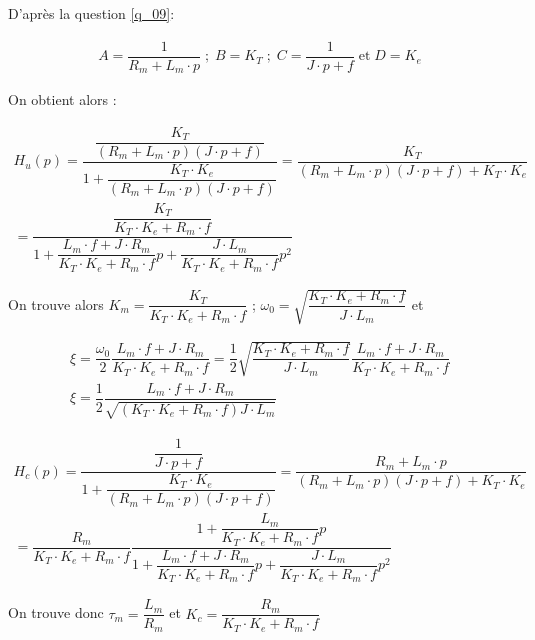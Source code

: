 \ifprof
\begin{corrige}
D'après la question \ref{q_09}: 

\begin{align*}
A=\dfrac{1}{R_m+L_m\cdot p} \;;\; B=K_T\;;\;C=\dfrac{1}{J\cdot p+f}\;\text{et} \;D=K_e
\end{align*}

On obtient alors : 

\begin{align*}
H_u(p)=\dfrac{\dfrac{K_T}{\left(R_m+L_m\cdot p\right)\left(J\cdot p+f\right)}}{1+\dfrac{K_T\cdot K_e}{\left(R_m+L_m\cdot p\right)\left(J\cdot p+f\right)}}
=\dfrac{K_T}{\left(R_m+L_m\cdot p\right)\left(J\cdot p+f\right)+K_T\cdot K_e}\\
=\dfrac{\dfrac{K_T}{K_T\cdot K_e+R_m\cdot f}}{1+\dfrac{L_m\cdot f+J\cdot R_m}{K_T\cdot K_e+R_m\cdot f}p+\dfrac{J\cdot L_m}{K_T\cdot K_e+R_m\cdot f}p^2}
\end{align*}

On trouve alors $K_m=\dfrac{K_T}{K_T\cdot K_e+R_m\cdot f}$ ; $\omega_0=\sqrt{\dfrac{K_T\cdot K_e+R_m\cdot f}{J\cdot L_m}}$ et

\begin{align*}
\xi=\dfrac{\omega_0}{2}\dfrac{L_m\cdot f+J\cdot R_m}{K_T\cdot K_e+R_m\cdot f}=\dfrac{1}{2}\sqrt{\dfrac{K_T\cdot K_e+R_m\cdot f}{J\cdot L_m}}\dfrac{L_m\cdot f+J\cdot R_m}{K_T\cdot K_e+R_m\cdot f}\\
\xi=\dfrac{1}{2}\dfrac{L_m\cdot f+J\cdot R_m}{\sqrt{\left(K_T\cdot K_e+R_m\cdot f\right)J\cdot L_m}}
\end{align*}

\begin{align*}
H_c(p)=\dfrac{\dfrac{1}{J\cdot p+f}}{1+\dfrac{K_T\cdot K_e}{\left(R_m+L_m\cdot p\right)\left(J\cdot p+f\right)}}
=\dfrac{R_m+L_m\cdot p}{\left(R_m+L_m\cdot p\right)\left(J\cdot p+f\right)+K_T\cdot K_e}\\
=\dfrac{R_m}{K_T\cdot K_e+R_m\cdot f}\dfrac{1+\dfrac{L_m}{K_T\cdot K_e+R_m\cdot f}p}{1+\dfrac{L_m\cdot f+J\cdot R_m}{K_T\cdot K_e+R_m\cdot f}p+\dfrac{J\cdot L_m}{K_T\cdot K_e+R_m\cdot f}p^2}
\end{align*}

On trouve donc $\tau_m=\dfrac{L_m}{R_m}$ et $K_c=\dfrac{R_m}{K_T\cdot K_e+R_m\cdot f}$
\end{corrige}
\else
\fi

